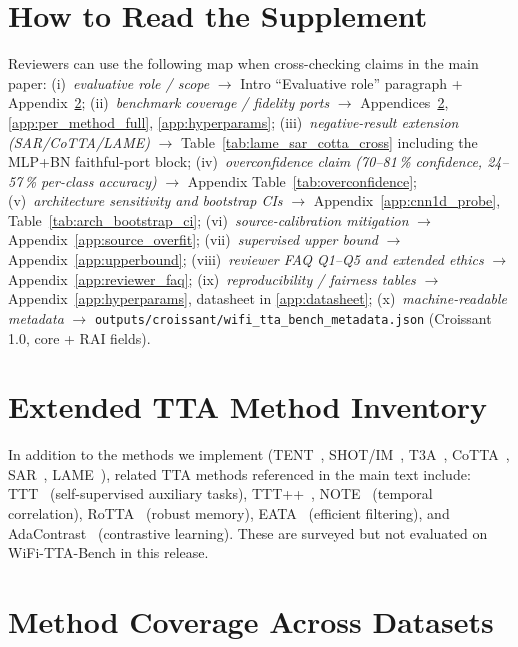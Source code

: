 \appendix

\section*{How to Read the Supplement}

Reviewers can use the following map when cross-checking claims in the main paper:
(i)~\emph{evaluative role / scope} $\to$ Intro ``Evaluative role'' paragraph + Appendix~\ref{app:coverage};
(ii)~\emph{benchmark coverage / fidelity ports} $\to$ Appendices~\ref{app:coverage}, \ref{app:per_method_full}, \ref{app:hyperparams};
(iii)~\emph{negative-result extension (SAR/CoTTA/LAME)} $\to$ Table~\ref{tab:lame_sar_cotta_cross} including the MLP+BN faithful-port block;
(iv)~\emph{overconfidence claim (70--81\,\% confidence, 24--57\,\% per-class accuracy)} $\to$ Appendix Table~\ref{tab:overconfidence};
(v)~\emph{architecture sensitivity and bootstrap CIs} $\to$ Appendix~\ref{app:cnn1d_probe}, Table~\ref{tab:arch_bootstrap_ci};
(vi)~\emph{source-calibration mitigation} $\to$ Appendix~\ref{app:source_overfit};
(vii)~\emph{supervised upper bound} $\to$ Appendix~\ref{app:upperbound};
(viii)~\emph{reviewer FAQ Q1--Q5 and extended ethics} $\to$ Appendix~\ref{app:reviewer_faq};
(ix)~\emph{reproducibility / fairness tables} $\to$ Appendix~\ref{app:hyperparams}, datasheet in \ref{app:datasheet};
(x)~\emph{machine-readable metadata} $\to$ \texttt{outputs/croissant/wifi\_tta\_bench\_metadata.json} (Croissant 1.0, core + RAI fields).

\section{Extended TTA Method Inventory}
\label{app:tta_methods}

In addition to the methods we implement (TENT~\cite{wang2021tent}, SHOT/IM~\cite{liang2020shot}, T3A~\cite{iwasawa2021t3a}, CoTTA~\cite{wang2022cotta}, SAR~\cite{niu2023sar}, LAME~\cite{boudiaf2022lame}), related TTA methods referenced in the main text include: TTT~\cite{sun2020ttt} (self-supervised auxiliary tasks), TTT++~\cite{liu2021ttt}, NOTE~\cite{gong2022note} (temporal correlation), RoTTA~\cite{yuan2023rotta} (robust memory), EATA~\cite{niu2022eata} (efficient filtering), and AdaContrast~\cite{chen2022adacontrast} (contrastive learning). These are surveyed but not evaluated on WiFi-TTA-Bench in this release.

\section{Method Coverage Across Datasets}
\label{app:coverage}

